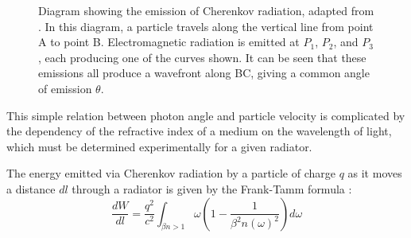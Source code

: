 \begin{figure}[]
\centering
{}
\caption[Diagram showing the emission of Cherenkov radiation]{Diagram showing the emission of Cherenkov radiation, adapted from \cite{cherenkov}.
In this diagram, a particle travels along the vertical line from point A to point B.
Electromagnetic radiation is emitted at $P_1$, $P_2$, and $P_3$, each producing one of the curves shown.
It can be seen that these emissions all produce a wavefront along BC, giving a common angle of emission $\theta$.}
\label{fig:cherenkov} 
\end{figure}

This simple relation between photon angle and particle velocity is complicated by the dependency of the refractive index of a medium on the wavelength of light, which must be determined experimentally for a given radiator.

The energy emitted via Cherenkov radiation by a particle of charge $q$ as it moves a distance $dl$ through a radiator is given by the Frank-Tamm formula \cite{frankTamm}:
\begin{equation}
    \label{eq:frankTamm}
    \frac{dW}{dl} = \frac{q^2}{c^2}\int_{\beta n > 1} \omega  \left(1 - \frac{1}{\beta^2n(\omega)^2}\right)d\omega
\end{equation}

